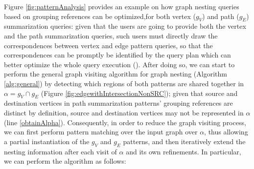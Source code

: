 Figure \vref{fig:patternAnalysis} provides an example on how  graph nesting queries based on grouping references can be optimized,for both vertex ($g_V$) and path ($g_E$) summarization queries: given that the users are going to provide both the vertex and the path summarization queries, such users must directly draw the correspondences between vertex and edge pattern queries, so that the correspondences can be promptly be identified by the query plan which can better optimize the whole query execution (). After doing so, we can start to perform the general graph visiting algorithm for graph nesting (Algorithm \ref{alg:general}) by detecting which regions of both patterns are shared together in $\alpha=g_V\cap g_E$ (Figure \ref{fig:edgewithIntersectionNonSRC}); given that source and destination vertices in path summarization patterns' grouping references are distinct by definition, source and destination vertices may not be represented in $\alpha$ (line \ref{obtainAlpha}). Consequently, in order to reduce the graph visiting process, we can first perform pattern matching over the input graph over $\alpha$, thus allowing a partial instantiation of the $g_V$ and $g_E$ patterns, and then iteratively extend the nesting information after each visit of $\alpha$ and  its own refinements. In particular, we can perform the algorithm  as follows:
